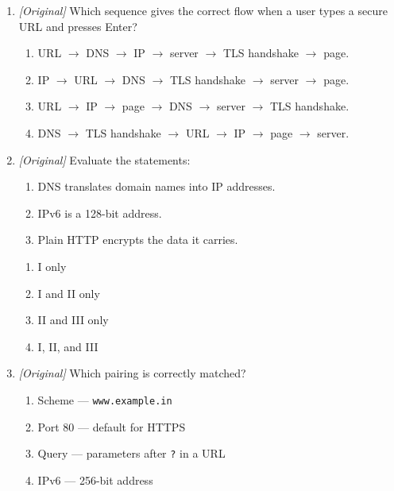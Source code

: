 \documentclass[11pt]{article}
\begin{document}
\begin{enumerate}[label=\textbf{Q\arabic*.}, leftmargin=*]
\begin{enumerate}[label=\Alph*.]
  \end{enumerate}
\item \textit{[Original]} Which sequence gives the correct flow when a user
  types a secure URL and presses Enter?
  \begin{enumerate}[label=\Alph*.]
    \item URL $\rightarrow$ DNS $\rightarrow$ IP $\rightarrow$ server
      $\rightarrow$ TLS handshake $\rightarrow$ page.
    \item IP $\rightarrow$ URL $\rightarrow$ DNS $\rightarrow$ TLS handshake
      $\rightarrow$ server $\rightarrow$ page.
    \item URL $\rightarrow$ IP $\rightarrow$ page $\rightarrow$ DNS
      $\rightarrow$ server $\rightarrow$ TLS handshake.
    \item DNS $\rightarrow$ TLS handshake $\rightarrow$ URL $\rightarrow$ IP
      $\rightarrow$ page $\rightarrow$ server.
  \end{enumerate}
\item \textit{[Original]} Evaluate the statements:
  \begin{enumerate}[label=\Roman*.]
    \item DNS translates domain names into IP addresses.
    \item IPv6 is a 128-bit address.
    \item Plain HTTP encrypts the data it carries.
  \end{enumerate}
  \begin{enumerate}[label=\Alph*.]
    \item I only
    \item I and II only
    \item II and III only
    \item I, II, and III
  \end{enumerate}
\item \textit{[Original]} Which pairing is correctly matched?
  \begin{enumerate}[label=\Alph*.]
    \item Scheme --- \texttt{www.example.in}
    \item Port 80 --- default for HTTPS
    \item Query --- parameters after \texttt{?} in a URL
    \item IPv6 --- 256-bit address
  \end{enumerate}


\end{enumerate}
\end{document}
